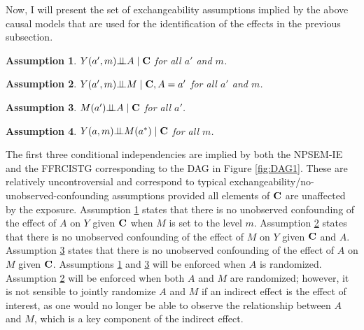 \documentclass[12pt]{article}
\newtheorem{assumption}{Assumption}
\def\ci{\mbox{\ensuremath{\perp\!\!\!\perp}}}
\begin{document}

Now, I will present the set of exchangeability assumptions implied by the above causal models that are used for the identification of the effects in the previous subsection. %
\begin{assumption}%
    \label{assn:NUCA-AY}
    $Y(a',m)\ci A\mid {\bf C}$ for all $a'$ and $m$.
\end{assumption}
\begin{assumption}%
    \label{assn:NUCA-MY}
    $Y(a',m)\ci M\mid {\bf C},A=a'$ for all $a'$ and $m$.
\end{assumption}
\begin{assumption}%
    \label{assn:NUCA-AM}
    $M(a')\ci A\mid {\bf C}$ for all $a'$.
\end{assumption}
\begin{assumption}%
    \label{assn:NPSEM}
     $Y(a,m)\ci M(a^*)\mid {\bf C}$ for all $m$.
\end{assumption}
The first three conditional independencies are implied by both the NPSEM-IE and the FFRCISTG corresponding to the DAG in Figure \ref{fig:DAG1}. These are relatively uncontroversial and correspond to typical exchangeability/no-unobserved-confounding assumptions provided all elements of ${\bf C}$ are unaffected by the exposure. Assumption \ref{assn:NUCA-AY} states that there is no unobserved confounding of the effect of $A$ on $Y$ given ${\bf C}$ when $M$ is set to the level $m$. Assumption \ref{assn:NUCA-MY} states that there is no unobserved confounding of the effect of $M$ on $Y$ given ${\bf C}$ and $A$. Assumption \ref{assn:NUCA-AM} states that there is no unobserved confounding of the effect of $A$ on $M$ given ${\bf C}$. Assumptions \ref{assn:NUCA-AY} and \ref{assn:NUCA-AM} will be enforced when $A$ is randomized. Assumption \ref{assn:NUCA-MY} will be enforced when both $A$ and $M$ are randomized; however, it is not sensible to jointly randomize $A$ and $M$ if an indirect effect is the effect of interest, as one would no longer be able to observe the relationship between $A$ and $M$, which is a key component of the indirect effect. 
\end{document}
